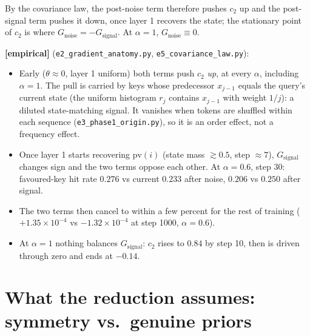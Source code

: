 \documentclass[11pt]{article}
\theoremstyle{definition}
\theoremstyle{remark}
\newcommand{\1}{\mathbf{1}}
\begin{document}
By the covariance law, the post-noise term therefore pushes $c_2$ up and the post-signal term
pushes it down, once layer 1 recovers the state; the stationary point of $c_2$ is where
$G_{\mathrm{noise}}=-G_{\mathrm{signal}}$. At $\alpha=1$, $G_{\mathrm{noise}}\equiv0$.

\textbf{[empirical]} (\texttt{e2\_gradient\_anatomy.py}, \texttt{e5\_covariance\_law.py}):
\begin{itemize}
\item Early ($\theta\approx0$, layer 1 uniform) both terms push $c_2$ \emph{up}, at every
$\alpha$, including $\alpha=1$. The pull is carried by keys whose predecessor $x_{j-1}$ equals
the query's current state (the uniform histogram $r_j$ contains $x_{j-1}$ with weight $1/j$): a
diluted state-matching signal. It vanishes when tokens are shuffled within each sequence
(\texttt{e3\_phase1\_origin.py}), so it is an order effect, not a frequency effect.
\item Once layer 1 starts recovering $\mathrm{pv}(i)$ (state mass $\gtrsim0.5$, step $\approx7$),
$G_{\mathrm{signal}}$ changes sign and the two terms oppose each other. At $\alpha=0.6$, step
30: favoured-key hit rate $0.276$ vs current $0.233$ after noise, $0.206$ vs $0.250$ after signal.
\item The two terms then cancel to within a few percent for the rest of training
($+1.35\times10^{-4}$ vs $-1.32\times10^{-4}$ at step 1000, $\alpha=0.6$).
\item At $\alpha=1$ nothing balances $G_{\mathrm{signal}}$: $c_2$ rises to $0.84$ by step 10,
then is driven through zero and ends at $-0.14$.
\end{itemize}

\section{What the reduction assumes: symmetry vs.\ genuine priors}
\end{document}
